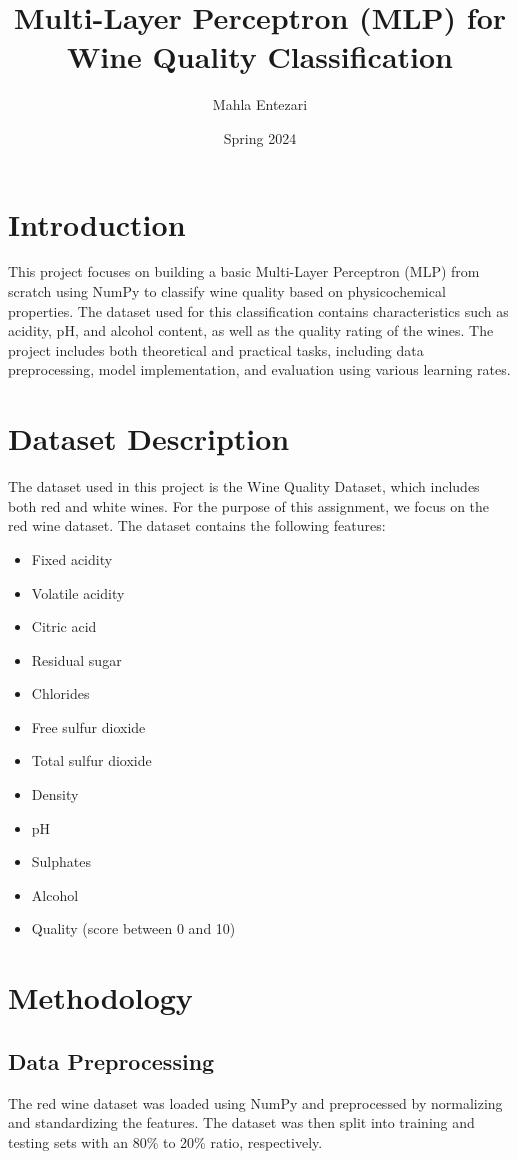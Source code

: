 \documentclass[12pt]{article}
\title{Multi-Layer Perceptron (MLP) for Wine Quality Classification}
\author{Mahla Entezari}
\date{Spring 2024}
\begin{document}
\maketitle

\section{Introduction}
This project focuses on building a basic Multi-Layer Perceptron (MLP) from scratch using NumPy to classify wine quality based on physicochemical properties. The dataset used for this classification contains characteristics such as acidity, pH, and alcohol content, as well as the quality rating of the wines. The project includes both theoretical and practical tasks, including data preprocessing, model implementation, and evaluation using various learning rates.

\section{Dataset Description}
The dataset used in this project is the Wine Quality Dataset, which includes both red and white wines. For the purpose of this assignment, we focus on the red wine dataset. The dataset contains the following features:

\begin{itemize}
    \item Fixed acidity
    \item Volatile acidity
    \item Citric acid
    \item Residual sugar
    \item Chlorides
    \item Free sulfur dioxide
    \item Total sulfur dioxide
    \item Density
    \item pH
    \item Sulphates
    \item Alcohol
    \item Quality (score between 0 and 10)
\end{itemize}

\section{Methodology}
\subsection{Data Preprocessing}
The red wine dataset was loaded using NumPy and preprocessed by normalizing and standardizing the features. The dataset was then split into training and testing sets with an 80\% to 20\% ratio, respectively.
\end{document}
